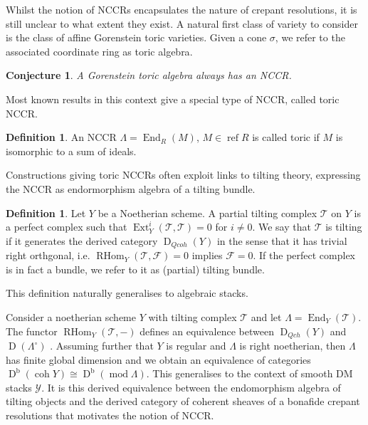 \documentclass[reqno, 12pt]{amsart}
\newtheorem{conjecture}[theorem]{Conjecture}
\theoremstyle{definition}
\newtheorem{definition}[theorem]{Definition}
\numberwithin{equation}{section}
\newcommand{\newterm}{\textsf}
\newcommand{\dbcoh}[1]{\operatorname{D}^{\operatorname{b}}(\operatorname{coh }#1)}
\newcommand{\dbmod}[1]{\operatorname{D}^{\operatorname{b}}(\operatorname{mod }#1)}
\newcommand{\End}{\operatorname{End}}
\newcommand{\Rhom}{\operatorname{RHom}}
\newcommand{\Ext}{\operatorname{Ext}}
\begin{document}
Whilst the notion of NCCRs encapsulates the nature of crepant resolutions, it is still unclear to what extent they exist. A natural first class of variety to consider is the class of affine Gorenstein toric varieties. Given a cone $\sigma$, we refer to the associated coordinate ring as \newterm{toric algebra}.

\begin{conjecture}
    \label{Conj:affinetoric}
    A Gorenstein toric algebra always has an NCCR.
\end{conjecture}

Most known results in this context give a special type of NCCR, called \newterm{toric NCCR}.
\begin{definition}
    \label{Def:ToricNCCR}
    An NCCR $\Lambda=\End_R(M)$, $M\in \operatorname{ref}R$ is called \newterm{toric} if $M$ is isomorphic to a sum of ideals.
\end{definition}
 
Constructions giving toric NCCRs often exploit links to tilting theory, expressing the NCCR as endormorphism algebra of a \newterm{tilting bundle}.

\begin{definition}
    \label{Def:tilt}
    Let $Y$ be a Noetherian scheme. A \newterm{partial tilting complex} $\mathcal{T}$ on $Y$ is a perfect complex such that $\Ext^i_Y(\mathcal{T},\mathcal{T})=0$ for $i\neq 0$. We say that $\mathcal{T}$ is \newterm{tilting} if it generates the derived category $\operatorname{D}_{Qcoh}(Y)$ in the sense that it has trivial right orthgonal, i.e. $\Rhom_Y(\mathcal{T},\mathcal{F})=0$ implies $\mathcal{F}=0$. If the perfect complex is in fact a bundle, we refer to it as \newterm{(partial) tilting bundle}.
\end{definition}
\noindent This definition naturally generalises to algebraic stacks. 

Consider a noetherian scheme $Y$ with tilting complex $\mathcal{T}$ and let $\Lambda=\End_{Y}(\mathcal{T})$. The functor $\Rhom_{Y}(\mathcal{T},-)$ defines an equivalence between $\operatorname{D}_{Qch}(Y)$ and $\operatorname{D}(\Lambda^\circ)$ \cite[Theorem 1.2]{KK20}. Assuming further that $Y$ is regular and $\Lambda$ is right noetherian, then $\Lambda$ has finite global dimension and we obtain an equivalence of categories $\dbcoh{Y}\cong \dbmod\Lambda$. This generalises to the context of smooth DM stacks $\mathcal{Y}$. It is this derived equivalence between the endomorphism algebra of tilting objects and the derived category of coherent sheaves of a bonafide crepant resolutions that motivates the notion of NCCR. 
\end{document}
